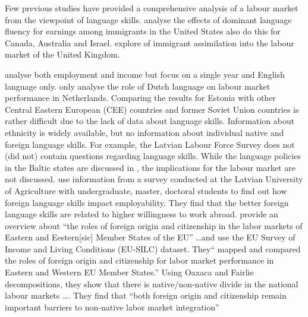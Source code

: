 \documentclass[12pt, a4paper]{article}
\begin{document}
Few previous studies have provided a comprehensive analysis of a labour
market from the viewpoint of language skills.
\citet{Chiswick1995, chiswick+miller2002, chiswick+miller2007, Bellante1998, Chiswick2010} analyse the effects of dominant language fluency for earnings among immigrants in the United States
\citet{Chiswick1995}  also do this for Canada, Australia and Israel.
\citet{Dustmann2003, shields+price2002} explore of immigrant assimilation into the labour market of the United Kingdom.


\citet{leslie+lindley2001} analyse both employment and income but
focus on a single year and English language only.
\citet{YaoandOurs2015} only analyse the role of Dutch language
on labour market performance in Netherlands.  
Comparing the results for Estonia with other Central Eastern European (CEE) countries and former Soviet Union countries is rather difficult due to the lack of data about language skills.
Information about ethnicity is widely available, but no information about individual native and foreign language skills.
For example, the Latvian Labour Force Survey does not (did not) contain questions regarding language skills.
While the language policies in the Baltic states are discussed in \cite{Hogan-Brun2008,Hogan-Brun2007}, the implications for the labour market are not discussed.
\cite{Grasmane2011} use information from a survey conducted at the Latvian University of Agriculture with undergraduate, master, doctoral students to find out  how foreign language skills impact employability.
They find that the better foreign language skills are related to higher willingness to work abroad.
\cite{Alan2015} 
\cite{Kahanec2009} provide an overview about \enquote{the roles of foreign origin and citizenship in the labor markets of Eastern and Eestern[sic] Member States of the EU} \dots and use the EU Survey of Income and Living Conditions (EU-SILC) dataset.
They\enquote{ mapped and compared the roles of foreign origin and citizenship for labor market performance in Eastern and Western EU Member States.}
Using Oaxaca and Fairlie decompositions, they show that there is native/non-native divide in the national labour markets \dots.
They find that \enquote{both foreign origin and citizenship remain important barriers to non-native labor market integration}
\end{document}

